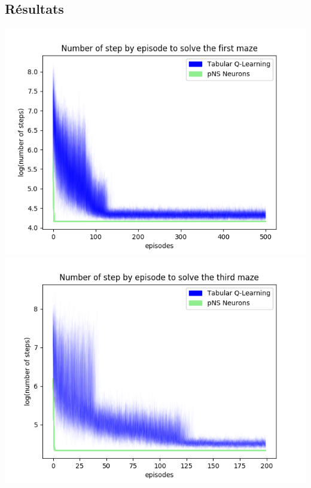 \documentclass[10pt]{article}
\begin{document}
\subsection{Résultats}
\indent\indent\indent\indent\includegraphics[scale=0.48]{Figure_log_final.png}\\

\indent\indent\indent\indent\includegraphics[scale=0.48]{Figure_log_final2.png}\\
\end{document}
